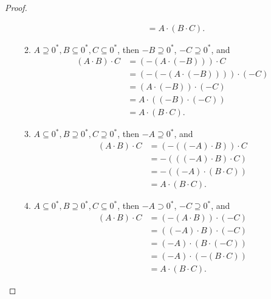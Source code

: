 \begin{proof}
\begin{enumerate}[label={(F\arabic*)}, start=5]
\begin{enumerate}[label={\textbf{Case \arabic*.}},topsep=0pt,itemsep=0pt]
\begin{align*}
                                              & = A\cdot (B\cdot C).
                        \end{align*}
                  \item $A\supseteq {0}^{*}, B\subseteq {0}^{*}, C\subseteq {0}^{*}$, then $-B\supseteq {0}^{*}$, $-C\supseteq {0}^{*}$, and
                        \begin{align*}
                            (A\cdot B)\cdot C & = (-(A\cdot (-B)))\cdot C       \\
                                              & = (-(-(A\cdot (-B))))\cdot (-C) \\
                                              & = (A\cdot (-B))\cdot (-C)       \\
                                              & = A\cdot ((-B)\cdot (-C))       \\
                                              & = A\cdot (B\cdot C).
                        \end{align*}
                  \item $A\subseteq {0}^{*}, B\supseteq {0}^{*}, C\supseteq {0}^{*}$, then $-A\supseteq {0}^{*}$, and
                        \begin{align*}
                            (A\cdot B)\cdot C & = (-((-A)\cdot B))\cdot C \\
                                              & = -(((-A)\cdot B)\cdot C) \\
                                              & = -((-A)\cdot (B\cdot C)) \\
                                              & = A\cdot (B\cdot C).
                        \end{align*}
                  \item $A\subseteq {0}^{*}, B\supseteq {0}^{*}, C\subseteq {0}^{*}$, then $-A\supset {0}^{*}$, $-C\supseteq {0}^{*}$, and
                        \begin{align*}
                            (A\cdot B)\cdot C & = (-(A\cdot B))\cdot (-C) \\
                                              & = ((-A)\cdot B)\cdot (-C) \\
                                              & = (-A)\cdot (B\cdot (-C)) \\
                                              & = (-A)\cdot (-(B\cdot C)) \\
                                              & = A\cdot (B\cdot C).
                        \end{align*}

\end{enumerate}
\end{enumerate}
\end{proof}
